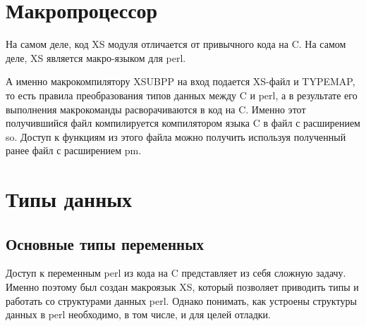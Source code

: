\section{Макропроцессор}
На самом деле, код XS модуля отличается от привычного кода на C. На самом деле, XS является макро-языком для perl.
\begin{figure}[H] \centering
\end{figure} \noindent
А именно макрокомпилятору XSUBPP на вход подается XS-файл и TYPEMAP, то есть правила преобразования типов данных между C и perl, а в результате его выполнения макрокоманды расворачиваются в код на C. Именно этот получившийся файл компилируется компилятором языка C в файл с расширением so. Доступ к функциям из этого файла можно получить используя полученный ранее файл с расширением pm.

\section{Типы данных}
\subsection{Основные типы переменных}
Доступ к переменным perl из кода на C представляет из себя сложную задачу. Именно поэтому был создан макроязык XS, который позволяет приводить типы и работать со структурами данных perl. Однако понимать, как устроены структуры данных в perl необходимо, в том числе, и для целей отладки.

